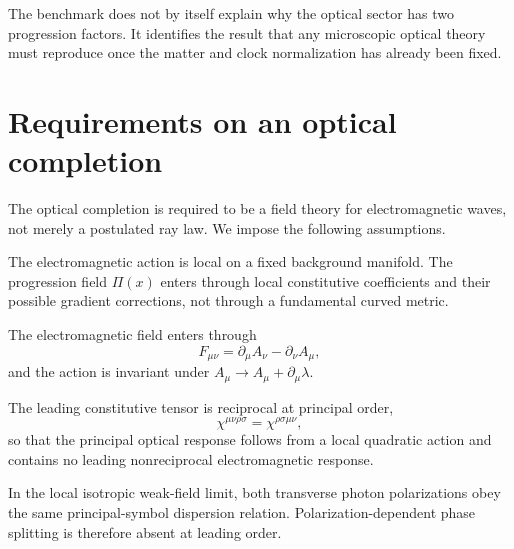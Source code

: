 \documentclass[12pt]{article}
\begin{document}
\begin{remark}
The benchmark does not by itself explain why the optical sector has two progression factors.  It identifies the result that any microscopic optical theory must reproduce once the matter and clock normalization has already been fixed.
\end{remark}

\section{Requirements on an optical completion}
\label{sec:requirements}

The optical completion is required to be a field theory for electromagnetic waves, not merely a postulated ray law.  We impose the following assumptions.

\begin{assumption}
The electromagnetic action is local on a fixed background manifold.  The progression field $\Pi(x)$ enters through local constitutive coefficients and their possible gradient corrections, not through a fundamental curved metric.
\end{assumption}

\begin{assumption}
The electromagnetic field enters through
\begin{equation}
 F_{\mu\nu}=\partial_\mu A_\nu-\partial_\nu A_\mu,
\label{eq:F_def}
\end{equation}
and the action is invariant under $A_\mu\rightarrow A_\mu+\partial_\mu\lambda$.
\end{assumption}


\begin{assumption}
The leading constitutive tensor is reciprocal at principal order,
\begin{equation}
 \chi^{\mu\nu\rho\sigma}=\chi^{\rho\sigma\mu\nu},
\label{eq:principal_reciprocity}
\end{equation}
so that the principal optical response follows from a local quadratic action and contains no leading nonreciprocal electromagnetic response.
\end{assumption}

\begin{assumption}
In the local isotropic weak-field limit, both transverse photon polarizations obey the same principal-symbol dispersion relation.  Polarization-dependent phase splitting is therefore absent at leading order.
\end{assumption}
\end{document}
